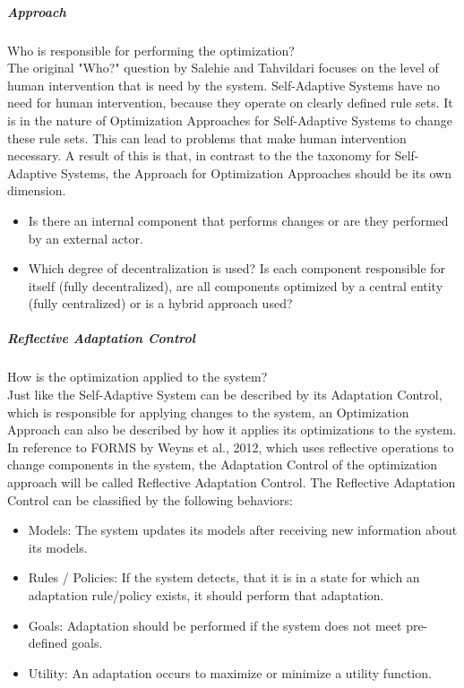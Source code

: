 \subparagraph*{Approach}
Who is responsible for performing the optimization? \\
The original "Who?" question by Salehie and Tahvildari focuses on the level of human intervention that is need by the system.
Self-Adaptive Systems have no need for human intervention, because they operate on clearly defined rule sets.
It is in the nature of Optimization Approaches for Self-Adaptive Systems to change these rule sets.
This can lead to problems that make human intervention necessary.
A result of this is that, in contrast to the the taxonomy for Self-Adaptive Systems, 
the Approach for Optimization Approaches should be its own dimension.
\begin{itemize}
    \item Is there an internal component that performs changes or are they performed by an external actor.
    \item Which degree of decentralization is used?
    Is each component responsible for itself (fully decentralized), are all components optimized by a central entity (fully centralized)
    or is a hybrid approach used?
\end{itemize}

\subparagraph*{Reflective Adaptation Control}
How is the optimization applied to the system? \\
Just like the Self-Adaptive System can be described by its Adaptation Control,
which is responsible for applying changes to the system,
an Optimization Approach can also be described by how it applies its optimizations to the system.
In reference to FORMS by Weyns et al., 2012\cite*{FORMS}, which uses reflective operations to change
components in the system, the Adaptation Control of the optimization approach will be called Reflective Adaptation Control.
The Reflective Adaptation Control can be classified by the following behaviors:
\begin{itemize}
    \item Models: The system updates its models after receiving new information about its models.
    \item Rules / Policies: If the system detects, that it is in a state for which an adaptation rule/policy exists,
    it should perform that adaptation.
    \item Goals: Adaptation should be performed if the system does not meet pre-defined goals.
    \item Utility: An adaptation occurs to maximize or minimize a utility function.
\end{itemize}

